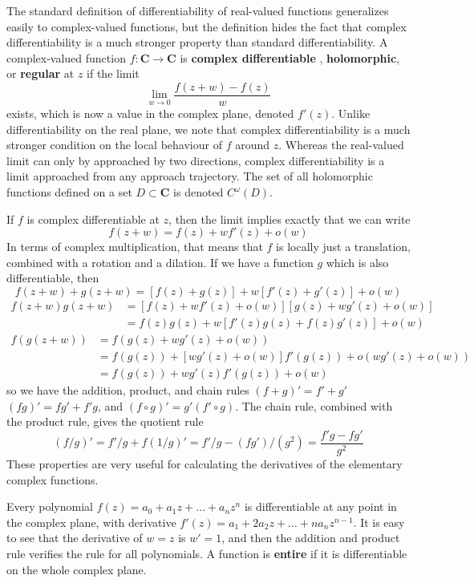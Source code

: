 The standard definition of differentiability of real-valued functions generalizes easily to complex-valued functions, but the definition hides the fact that complex differentiability is a much stronger property than standard differentiability. A complex-valued function $f: \mathbf{C} \to \mathbf{C}$ is {\bf complex differentiable
}, {\bf holomorphic}, or {\bf regular} at $z$ if the limit
%
\[ \lim_{w \to 0} \frac{f(z + w) - f(z)}{w} \]
%
exists, which is now a value in the complex plane, denoted $f'(z)$. Unlike differentiability on the real plane, we note that complex differentiability is a much stronger condition on the local behaviour of $f$ around $z$. Whereas the real-valued limit can only by approached by two directions, complex differentiability is a limit approached from any approach trajectory. The set of all holomorphic functions defined on a set $D \subset \mathbf{C}$ is denoted $C^\omega(D)$.

If $f$ is complex differentiable at $z$, then the limit implies exactly that we can write
%
\[ f(z + w) = f(z) + w f'(z) + o(w) \]
%
In terms of complex multiplication, that means that $f$ is locally just a translation, combined with a rotation and a dilation. If we have a function $g$ which is also differentiable, then
%
\[ f(z + w) + g(z + w) = [f(z) + g(z)] + w[f'(z) + g'(z)] + o(w) \]
\begin{align*}
    f(z + w)g(z + w) &= [f(z) + wf'(z) + o(w)][g(z) + wg'(z) + o(w)]\\
    &= f(z)g(z) + w[f'(z)g(z) + f(z)g'(z)] + o(w)
\end{align*}
\begin{align*}
    f(g(z + w)) &= f(g(z) + wg'(z) + o(w))\\
    &= f(g(z)) + [wg'(z) + o(w)]f'(g(z)) + o(wg'(z) + o(w))\\
    &= f(g(z)) + wg'(z)f'(g(z)) + o(w)
\end{align*}
%
so we have the addition, product, and chain rules $(f + g)' = f' + g'$ $(fg)' = fg' + f'g$, and $(f \circ g)' = g'(f' \circ g)$. The chain rule, combined with the product rule, gives the quotient rule
%
\[ (f/g)' = f'/g + f(1/g)' = f'/g - (fg')/(g^2) = \frac{f'g - fg'}{g^2} \]
%
These properties are very useful for calculating the derivatives of the elementary complex functions.

\begin{example}
    Every polynomial $f(z) = a_0 + a_1z + \dots + a_nz^n$ is differentiable at any point in the complex plane, with derivative $f'(z) = a_1 + 2a_2z + \dots + na_nz^{n-1}$. It is easy to see that the derivative of $w = z$ is $w' = 1$, and then the addition and product rule verifies the rule for all polynomials. A function is {\bf entire} if it is differentiable on the whole complex plane.
\end{example}

